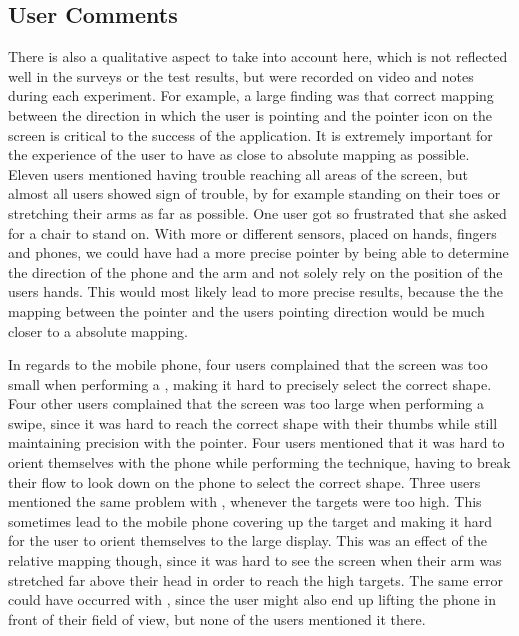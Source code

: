 \subsection{User Comments}
There is also a qualitative aspect to take into account here, which is not reflected well in the surveys or the test results, but were recorded on video and notes during each experiment.
For example, a large finding was that correct mapping between the direction in which the user is pointing and the pointer icon on the screen is critical to the success of the application.
It is extremely important for the experience of the user to have as close to absolute mapping as possible. 
Eleven users mentioned having trouble reaching all areas of the screen, but almost all users showed sign of trouble, by for example standing on their toes or stretching their arms as far as possible.
One user got so frustrated that she asked for a chair to stand on. 
With more or different sensors, placed on hands, fingers and phones, we could have had a more precise pointer by being able to determine the direction of the phone and the arm and not solely rely on the position of the users hands.
This would most likely lead to more precise results, because the the mapping between the pointer and the users pointing direction would be much closer to a absolute mapping.

In regards to the mobile phone, four users complained that the screen was too small when performing a \pinch, making it hard to precisely select the correct shape.
Four other users complained that the screen was too large when performing a swipe, since it was hard to reach the correct shape with their thumbs while still maintaining precision with the pointer. 
Four users mentioned that it was hard to orient themselves with the phone while performing the \throw technique, having to break their flow to look down on the phone to select the correct shape. 
Three users mentioned the same problem with \swipe, whenever the targets were too high.
This sometimes lead to the mobile phone covering up the target and making it hard for the user to orient themselves to the large display. 
This was an effect of the relative mapping though, since it was hard to see the screen when their arm was stretched far above their head in order to reach the high targets.
The same error could have occurred with \tilt, since the user might also end up lifting the phone in front of their field of view, but none of the users mentioned it there.  

